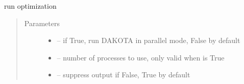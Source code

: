 \documentclass[letterpaper,10pt,english]{sphinxmanual}
\begin{document}
\begin{fulllineitems}
\begin{fulllineitems}
\end{fulllineitems}


\begin{fulllineitems}
\label{\detokenize{src/apidocs/genopt:genopt.DakotaOC.ref_flag}}
\end{fulllineitems}


\begin{fulllineitems}
\label{\detokenize{src/apidocs/genopt:genopt.DakotaOC.ref_x0}}
\end{fulllineitems}


\begin{fulllineitems}
\label{\detokenize{src/apidocs/genopt:genopt.DakotaOC.ref_y0}}
\end{fulllineitems}


\begin{fulllineitems}
\label{\detokenize{src/apidocs/genopt:genopt.DakotaOC.run}}
run optimization
\begin{quote}\begin{description}
\item[{Parameters}] \leavevmode\begin{itemize}
\item {} 
 -- if True, run DAKOTA in parallel mode, False by default

\item {} 
 -- number of processes to use, only valid when  is True

\item {} 
 -- suppress output if False, True by default

\end{itemize}

\end{description}\end{quote}

\end{fulllineitems}


\end{fulllineitems}
\end{document}
